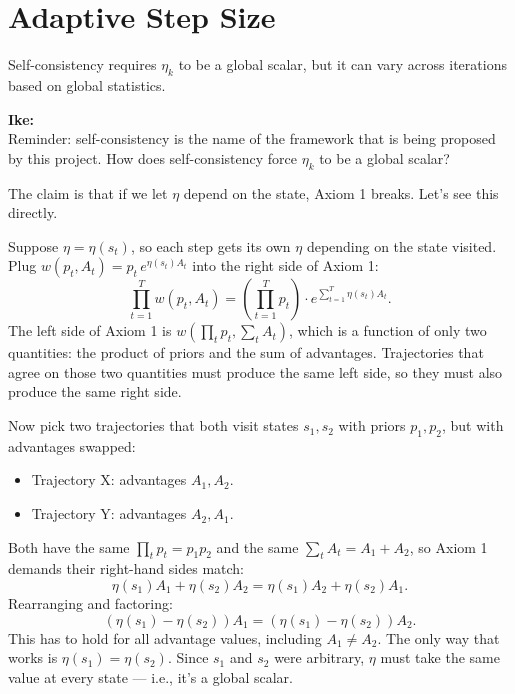 \documentclass[11pt]{article}
\theoremstyle{definition}
\theoremstyle{remark}
\newenvironment{ike}{\color{blue}\textbf{Ike:}\\}{}
\begin{document}
\section{Adaptive Step Size}
\label{sec:adaptive-eta}

Self-consistency requires $\eta_k$ to be a global scalar, but it can vary across iterations based on global statistics. 

\begin{ike}
Reminder: self-consistency is the name of the framework that is being proposed by this project. How does self-consistency force $\eta_k$ to be a global scalar?

The claim is that if we let $\eta$ depend on the state, Axiom 1 breaks. Let's see this directly.

Suppose $\eta = \eta(s_t)$, so each step gets its own $\eta$ depending on the state visited. Plug $w(p_t, A_t) = p_t \, e^{\eta(s_t) A_t}$ into the right side of Axiom 1:
\[
\prod_{t=1}^{T} w(p_t, A_t) = \left(\prod_{t=1}^{T} p_t\right) \cdot e^{\sum_{t=1}^{T} \eta(s_t) A_t}.
\]
The left side of Axiom 1 is $w\!\left(\prod_t p_t, \sum_t A_t\right)$, which is a function of only two quantities: the product of priors and the sum of advantages. Trajectories that agree on those two quantities must produce the same left side, so they must also produce the same right side.

Now pick two trajectories that both visit states $s_1, s_2$ with priors $p_1, p_2$, but with advantages swapped:
\begin{itemize}
    \item Trajectory X: advantages $A_1, A_2$.
    \item Trajectory Y: advantages $A_2, A_1$.
\end{itemize}
Both have the same $\prod_t p_t = p_1 p_2$ and the same $\sum_t A_t = A_1 + A_2$, so Axiom 1 demands their right-hand sides match:
\[
\eta(s_1) A_1 + \eta(s_2) A_2 = \eta(s_1) A_2 + \eta(s_2) A_1.
\]
Rearranging and factoring:
\[
(\eta(s_1) - \eta(s_2)) A_1 = (\eta(s_1) - \eta(s_2)) A_2.
\]
This has to hold for all advantage values, including $A_1 \neq A_2$. The only way that works is $\eta(s_1) = \eta(s_2)$. Since $s_1$ and $s_2$ were arbitrary, $\eta$ must take the same value at every state --- i.e., it's a global scalar.
\end{ike}
\end{document}
